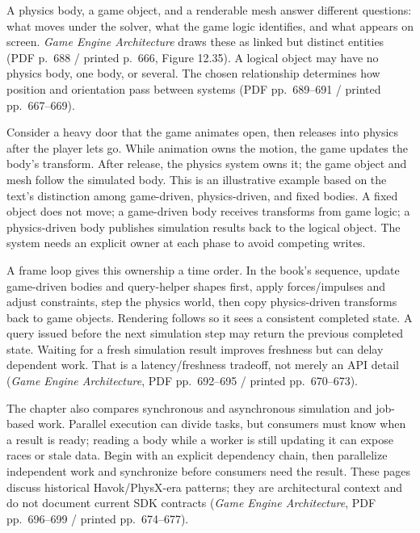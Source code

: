 \hypertarget{06-engine-ii-ch033-connect-simulation-bodies-to-logical-objects-and-rendered-meshes}{}

A physics body, a game object, and a renderable mesh answer different questions: what moves under the solver, what the game logic identifies, and what appears on screen. \emph{Game Engine Architecture} draws these as linked but distinct entities (PDF p.~688 / printed p.~666, Figure 12.35). A logical object may have no physics body, one body, or several. The chosen relationship determines how position and orientation pass between systems (PDF pp.~689--691 / printed pp.~667--669).

Consider a heavy door that the game animates open, then releases into physics after the player lets go. While animation owns the motion, the game updates the body's transform. After release, the physics system owns it; the game object and mesh follow the simulated body. This is an illustrative example based on the text's distinction among game-driven, physics-driven, and fixed bodies. A fixed object does not move; a game-driven body receives transforms from game logic; a physics-driven body publishes simulation results back to the logical object. The system needs an explicit owner at each phase to avoid competing writes.

A frame loop gives this ownership a time order. In the book's sequence, update game-driven bodies and query-helper shapes first, apply forces/impulses and adjust constraints, step the physics world, then copy physics-driven transforms back to game objects. Rendering follows so it sees a consistent completed state. A query issued before the next simulation step may return the previous completed state. Waiting for a fresh simulation result improves freshness but can delay dependent work. That is a latency/freshness tradeoff, not merely an API detail (\emph{Game Engine Architecture}, PDF pp.~692--695 / printed pp.~670--673).

The chapter also compares synchronous and asynchronous simulation and job-based work. Parallel execution can divide tasks, but consumers must know when a result is ready; reading a body while a worker is still updating it can expose races or stale data. Begin with an explicit dependency chain, then parallelize independent work and synchronize before consumers need the result. These pages discuss historical Havok/PhysX-era patterns; they are architectural context and do not document current SDK contracts (\emph{Game Engine Architecture}, PDF pp.~696--699 / printed pp.~674--677).

